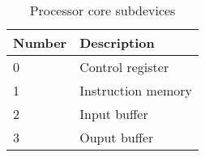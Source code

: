 \begin{table}[h]
	\centering
	\begin{tabular}{|l l|}
		\hline
		\textbf{Number} & \textbf{Description} \\
		\hline
		0 & Control register \\
		1 & Instruction memory \\
		2 & Input buffer \\
		3 & Ouput buffer \\
		\hline
	\end{tabular}

	\caption{Processor core subdevices}
	\label{tab:core_subdevices}
\end{table}
